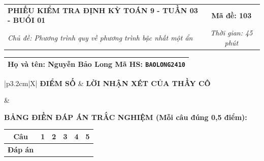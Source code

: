 \documentclass[12pt,a4paper]{article}
\begin{document}
\newpage


\noindent
\begin{tabularx}{\linewidth}{|X|c|}
\hline
\textbf{PHIẾU KIỂM TRA ĐỊNH KỲ TOÁN 9 - TUẦN 03 - BUỔI 01} & \textbf{Mã đề: 103} \\
\textit{Chủ đề: Phương trình quy về phương trình bậc nhất một ẩn} & \textit{Thời gian: 45 phút} \\
\hline
\end{tabularx}

\vspace{1mm}

\noindent
\begin{tabularx}{\linewidth}{|X|}
\hline
\rule[-2mm]{0pt}{7.5mm}\textbf{Họ và tên:} \textbf{\large Nguyễn Bảo Long} \hfill \textbf{Mã HS:} \texttt{BAOLONG2410} \quad \\
\hline
\end{tabularx}

\vspace{1mm}

\noindent
\begin{tabularx}{\linewidth}{|p{3.2cm}|X|}
\hline
\centering\textbf{ĐIỂM SỐ} & \centering\textbf{LỜI NHẬN XÉT CỦA THẦY CÔ} \tabularnewline
\hline
\rule{0pt}{1.3cm} & \tabularnewline
\hline
\end{tabularx}

\vspace{1.2mm}

\noindent\textbf{BẢNG ĐIỀN ĐÁP ÁN TRẮC NGHIỆM (Mỗi câu đúng 0,5 điểm):}
\vspace{0.8mm}

\noindent
\renewcommand{\arraystretch}{1.35}
\begin{tabularx}{\linewidth}{|c|*{5}{>{\centering\arraybackslash}X|}}
\hline
\textbf{Câu} & \textbf{1} & \textbf{2} & \textbf{3} & \textbf{4} & \textbf{5} \\
\hline
\textbf{Đáp án} & & & & & \\
\hline
\end{tabularx}
\renewcommand{\arraystretch}{1.0}

\vspace{1.5mm}
\end{document}
